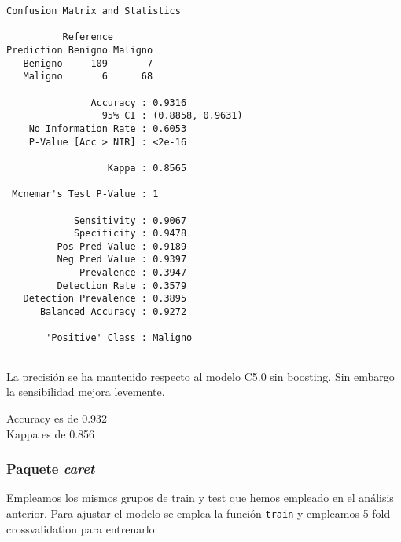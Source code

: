 \documentclass[
]{article}
\begin{document}
\begin{verbatim}
Confusion Matrix and Statistics

          Reference
Prediction Benigno Maligno
   Benigno     109       7
   Maligno       6      68
                                          
               Accuracy : 0.9316          
                 95% CI : (0.8858, 0.9631)
    No Information Rate : 0.6053          
    P-Value [Acc > NIR] : <2e-16          
                                          
                  Kappa : 0.8565          
                                          
 Mcnemar's Test P-Value : 1               
                                          
            Sensitivity : 0.9067          
            Specificity : 0.9478          
         Pos Pred Value : 0.9189          
         Neg Pred Value : 0.9397          
             Prevalence : 0.3947          
         Detection Rate : 0.3579          
   Detection Prevalence : 0.3895          
      Balanced Accuracy : 0.9272          
                                          
       'Positive' Class : Maligno         
                                          
\end{verbatim}

La precisión se ha mantenido respecto al modelo C5.0 sin boosting. Sin
embargo la sensibilidad mejora levemente.

Accuracy es de 0.932\\
Kappa es de 0.856

\hypertarget{paquete-caret-1}{%
\subsubsection{\texorpdfstring{Paquete
\emph{caret}}{Paquete caret}}\label{paquete-caret-1}}

Empleamos los mismos grupos de train y test que hemos empleado en el
análisis anterior. Para ajustar el modelo se emplea la función
\texttt{train} y empleamos 5-fold crossvalidation para entrenarlo:
\end{document}

